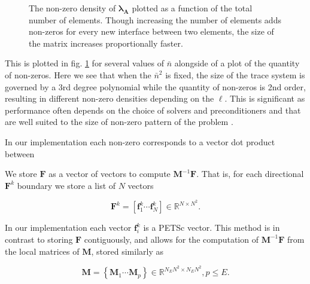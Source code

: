 \begin{figure}
	\centering
	\begin{subfigure}{\columnwidth}
		\centering
		
		
	\end{subfigure}
	\bigskip
	\begin{subfigure}{\columnwidth}
		\centering
		
	\end{subfigure}
	\caption{The non-zero density of $\symbf{\lambda}_{\textbf{A}}$ 
	plotted as a function of the total number of elements. Though increasing the number of elements adds non-zeros for every new interface between two elements, the size of the matrix increases proportionally faster.}
	\label{fig:nz_density} 
\end{figure}

\noindent
This is plotted in fig. \ref{fig:nz_density} for several values of $\bar{n}$ alongside of a plot of the quantity of non-zeros. Here we see that when the $\bar{n}^2$ is fixed, the size of the trace system is governed by a 3rd degree polynomial while the quantity of non-zeros is 2nd order, resulting in different non-zero densities depending on the $\ell$. This is significant as performance often depends on the choice of solvers and preconditioners and that are well suited to the size of non-zero pattern of the problem \citep{bollhofer2020state}. %

In our implementation each non-zero corresponds to a vector dot product between 

\noindent
We store $\textbf{F}$ as a vector of vectors to compute $\textbf{M}^{-1}\textbf{F}$. That is, for each directional $\textbf{F}^k$ boundary we store a list of $N$ vectors

\begin{equation}
	\textbf{F}^k = \left[\textbf{f}^k_1 \cdots \textbf{f}^k_N\right] \in \mathbb{R}^{N \times N^2}.
\end{equation} 

\noindent
In our implementation each vector $\textbf{f}^k_i$ is a PETSc vector. This method is in contrast to storing $\textbf{F}$ contiguously, and allows for the computation of $\textbf{M}^{-1}\textbf{F}$ from the local matrices of $\textbf{M}$, stored similarly as

\begin{equation}
	\textbf{M} = \left\{\textbf{M}_1 \cdots \textbf{M}_p\right\} \in \mathbb{R}^{N_{E}N^2 \times N_{E}N^2}, p \leq E.
\end{equation} 

